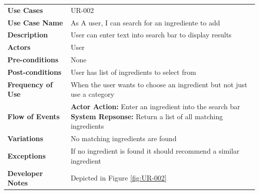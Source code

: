 \documentclass[12pt]{article}
\begin{document}
  \begin{tabular}{ l | l }
    \hline
    \textbf{Use Cases} & UR-002 \\ \rowcolor[gray]{.95}
    \textbf{Use Case Name} & As A user, I can search for an ingrediente to add  \\ 
    \textbf{Description} & User can enter text into search bar to display results \\ \rowcolor[gray]{.95}
    \textbf{Actors} & User \\
    \textbf{Pre-conditions} & None \\ \rowcolor[gray]{.95}
    \textbf{Post-conditions} & User has list of ingredients to select from \\ 
    \textbf{Frequency of Use} & When the user wants to choose an ingredient but not just use a category \\ \rowcolor[gray]{.95}
    \textbf{Flow of Events} & \pbox{20cm}{\textbf{Actor Action: }Enter an ingredient into the search bar \\
    \textbf{System Repsonse:} Return a list of all matching ingredients }  \\
    \textbf{Variations} & No matching ingredients are found \\  \rowcolor[gray]{.95}
    \textbf{Exceptions} & If no ingredient is found it should recommend a similar ingredient \\
    \textbf{Developer Notes} &  Depicted in Figure \ref{fig:UR-002}\\ \hline
  \end{tabular}
 
\end{document}
